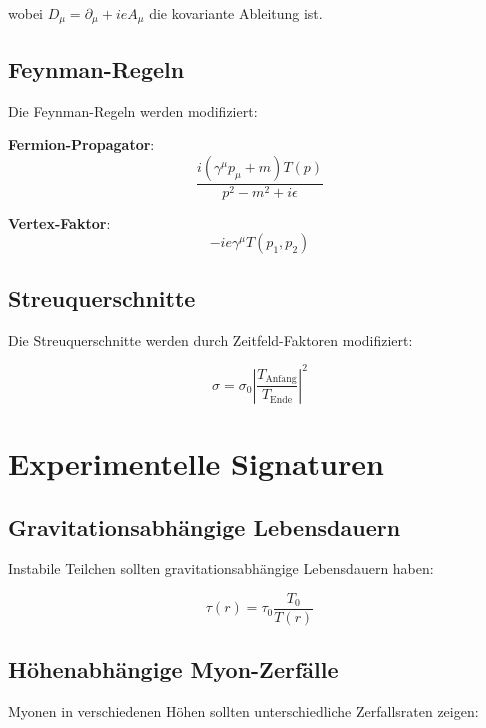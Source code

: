 \documentclass[12pt,a4paper]{report}
\begin{document}
	wobei $D_\mu = \partial_\mu + ieA_\mu$ die kovariante Ableitung ist.
	
	\subsection{Feynman-Regeln}
	
	Die Feynman-Regeln werden modifiziert:
	
	\textbf{Fermion-Propagator}:
	\begin{equation}
		\frac{i(\gamma^\mu p_\mu + m)T(p)}{p^2 - m^2 + i\epsilon}
	\end{equation}
	
	\textbf{Vertex-Faktor}:
	\begin{equation}
		-ie\gamma^\mu T(p_1, p_2)
	\end{equation}
	
	\subsection{Streuquerschnitte}
	
	Die Streuquerschnitte werden durch Zeitfeld-Faktoren modifiziert:
	
	\begin{equation}
		\sigma = \sigma_0 \left|\frac{T_{\text{Anfang}}}{T_{\text{Ende}}}\right|^2
	\end{equation}
	
	\section{Experimentelle Signaturen}
	
	\subsection{Gravitationsabhängige Lebensdauern}
	
	Instabile Teilchen sollten gravitationsabhängige Lebensdauern haben:
	
	\begin{equation}
		\tau(r) = \tau_0 \frac{T_0}{T(r)}
	\end{equation}
	
	\subsection{Höhenabhängige Myon-Zerfälle}
	
	Myonen in verschiedenen Höhen sollten unterschiedliche Zerfallsraten zeigen:
	
\end{document}
